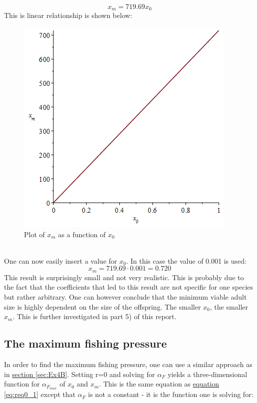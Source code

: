 \documentclass{article}
\numberwithin{equation}{section} %
\begin{document}
\begin{equation}
	x_m = 719.69x_0
\end{equation}
This is linear relationship is shown below:
\begin{figure}[h!]
\centering
\includegraphics[width=.75\textwidth]{exercises/ex4p3}
	\caption{Plot of $x_m$ as a function of $x_0$}
	\label{fig:linrelxmx0}
\end{figure}\\
One can now easily insert a value for $x_0$. In this case the value of 0.001 is used:
\begin{equation}
	x_m = 719.69\cdot0.001 = 0.720
\end{equation}
This result is surprisingly small and not very realistic. This is probably due to the fact that the coefficients that led to this result are not specific for one species but rather arbitrary. One can however conclude that the minimum viable adult size is highly dependent on the size of the offspring. The smaller $x_0$, the smaller $x_m$. This is further investigated in part 5) of this report.
\subsection{The maximum fishing pressure}\label{sec:Ex4C}
In order to find the maximum fishing pressure, one can use a similar approach as in \hyperref[sec:Ex4B]{section \ref{sec:Ex4B}}. Setting r=0 and solving for $\alpha_F$ yields a three-dimensional function for $\alpha_{F_{max}}$ of $x_0$ and $x_m$. This is the same equation as \hyperref[sec:Ex4B]{equation \ref{eq:req0_1}} except that $\alpha_F$ is not a constant - it is the function one is solving for:
\end{document}

